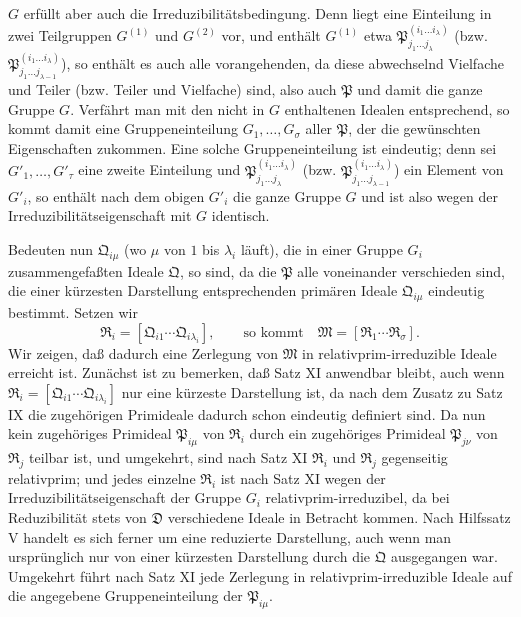 \documentclass[11pt]{article}
\newcommand{\ideal}[1]{\mathfrak{#1}}
\begin{document}
$G$ erfüllt aber auch die Irreduzibilitätsbedingung. Denn liegt eine Einteilung in zwei Teilgruppen $G^{(1)}$ und $G^{(2)}$ vor, und enthält $G^{(1)}$ etwa $\ideal P_{j_1\ldots j_\lambda}^{(i_1\ldots i_\lambda)}$ (bzw. $\ideal P_{j_1\ldots j_{\lambda-1}}^{(i_1\ldots i_\lambda)}$), so enthält es auch alle vorangehenden, da diese abwechselnd Vielfache und Teiler (bzw. Teiler und Vielfache) sind, also auch $\ideal P$ und damit die ganze Gruppe $G$. Verfährt man mit den nicht in $G$ enthaltenen Idealen entsprechend, so kommt damit eine Gruppeneinteilung $G_1,
\ldots,G_\sigma$ aller $\ideal P$, der die gewünschten Eigenschaften zukommen. Eine solche Gruppeneinteilung ist eindeutig; denn sei $G'_1,
\ldots,G'_\tau$ eine zweite Einteilung und $\ideal P_{j_1\ldots j_\lambda}^{(i_1\ldots i_\lambda)}$ (bzw. $\ideal P_{j_1\ldots j_{\lambda-1}}^{(i_1\ldots i_\lambda)}$) ein Element von $G'_i$, so enthält nach dem obigen $G'_i$ die ganze Gruppe $G$ und ist also wegen der Irreduzibilitätseigenschaft mit $G$ identisch.

Bedeuten nun $\ideal Q_{i\mu}$ (wo $\mu$ von $1$ bis $\lambda_i$ läuft), die in einer Gruppe $G_i$ zusammengefaßten Ideale $\ideal Q$, so sind, da die $\ideal P$ alle voneinander verschieden sind, die einer kürzesten Darstellung entsprechenden primären Ideale $\ideal Q_{i\mu}$ eindeutig bestimmt. Setzen wir
\[
 \ideal R_i=[\ideal Q_{i1}\cdots\ideal Q_{i\lambda_i}],\qquad
 \text{so kommt}\quad
 \ideal M=[\ideal R_1\cdots\ideal R_\sigma].
\]
Wir zeigen, daß dadurch eine Zerlegung von $\ideal M$ in relativprim-irreduzible Ideale erreicht ist. Zunächst ist zu bemerken, daß Satz XI anwendbar bleibt, auch wenn $\ideal R_i=[\ideal Q_{i1}\cdots\ideal Q_{i\lambda_i}]$ nur eine kürzeste Darstellung ist, da nach dem Zusatz zu Satz IX die zugehörigen Primideale dadurch schon eindeutig definiert sind. Da nun kein zugehöriges Primideal $\ideal P_{i\mu}$ von $\ideal R_i$ durch ein zugehöriges Primideal $\ideal P_{j\nu}$ von $\ideal R_j$ teilbar ist, und umgekehrt, sind nach Satz XI $\ideal R_i$ und $\ideal R_j$ gegenseitig relativprim; und jedes einzelne $\ideal R_i$ ist nach Satz XI wegen der Irreduzibilitätseigenschaft der Gruppe $G_i$ relativprim-irreduzibel, da bei Reduzibilität stets von $\ideal D$ verschiedene Ideale in Betracht kommen. Nach Hilfssatz V handelt es sich ferner um eine reduzierte Darstellung, auch wenn man ursprünglich nur von einer kürzesten Darstellung durch die $\ideal Q$ ausgegangen war. Umgekehrt führt nach Satz XI jede Zerlegung in relativprim-irreduzible Ideale auf die angegebene Gruppeneinteilung der $\ideal P_{i\mu}$.
\end{document}
